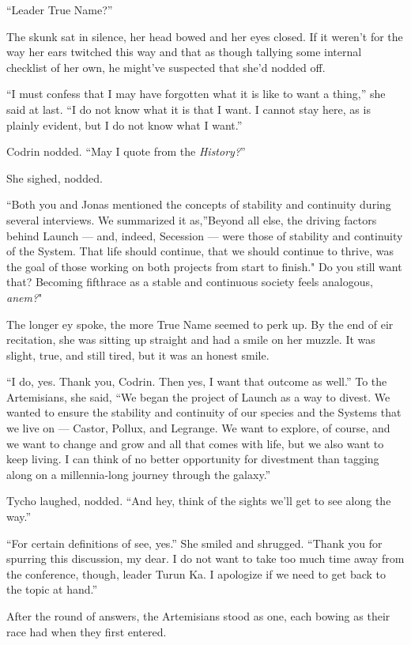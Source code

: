 ``Leader True Name?''

The skunk sat in silence, her head bowed and her eyes closed. If it weren't for the way her ears twitched this way and that as though tallying some internal checklist of her own, he might've suspected that she'd nodded off.

``I must confess that I may have forgotten what it is like to want a thing,'' she said at last. ``I do not know what it is that I want. I cannot stay here, as is plainly evident, but I do not know what I want.''

Codrin nodded. ``May I quote from the \emph{History?}''

She sighed, nodded.

``Both you and Jonas mentioned the concepts of stability and continuity during several interviews. We summarized it as,''Beyond all else, the driving factors behind Launch — and, indeed, Secession — were those of stability and continuity of the System. That life should continue, that we should continue to thrive, was the goal of those working on both projects from start to finish." Do you still want that? Becoming fifthrace as a stable and continuous society feels analogous, \emph{anem?}"

The longer ey spoke, the more True Name seemed to perk up. By the end of eir recitation, she was sitting up straight and had a smile on her muzzle. It was slight, true, and still tired, but it was an honest smile.

``I do, yes. Thank you, Codrin. Then yes, I want that outcome as well.'' To the Artemisians, she said, ``We began the project of Launch as a way to divest. We wanted to ensure the stability and continuity of our species and the Systems that we live on — Castor, Pollux, and Legrange. We want to explore, of course, and we want to change and grow and all that comes with life, but we also want to keep living. I can think of no better opportunity for divestment than tagging along on a millennia-long journey through the galaxy.''

Tycho laughed, nodded. ``And hey, think of the sights we'll get to see along the way.''

``For certain definitions of see, yes.'' She smiled and shrugged. ``Thank you for spurring this discussion, my dear. I do not want to take too much time away from the conference, though, leader Turun Ka. I apologize if we need to get back to the topic at hand.''

After the round of answers, the Artemisians stood as one, each bowing as their race had when they first entered.

